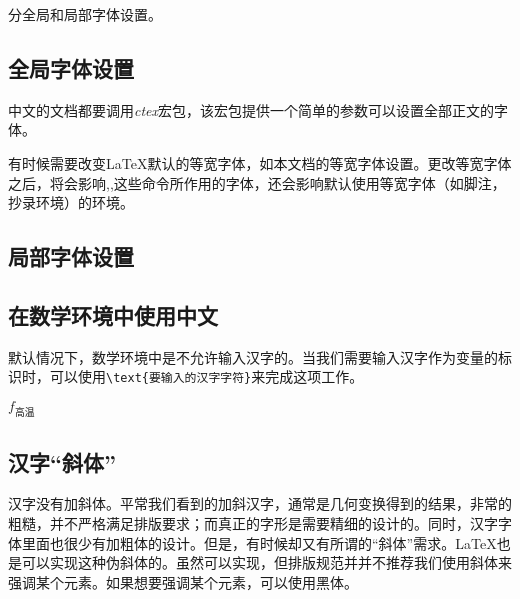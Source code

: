 分全局和局部字体设置。
\subsection{全局字体设置}
中文的文档都要调用\emph{ctex}宏包，该宏包提供一个简单的参数可以设置全部正文的字体。

\begin{latex}
\setmainfont{Times New Roman}    %
\end{latex}

有时候需要改变\LaTeX 默认的等宽字体，如本文档的等宽字体设置。更改等宽字体之后，将会影响,,这些命令所作用的字体，还会影响默认使用等宽字体（如脚注，抄录环境）的环境。

\begin{latex}
\setmonofont{Source Code Pro}    %
\end{latex}

\subsection{局部字体设置}

\begin{latex}
\newfontfamily{}    %
\end{latex}

\subsection{在数学环境中使用中文}
默认情况下，数学环境中是不允许输入汉字的。当我们需要输入汉字作为变量的标识时，可以使用\verb|\text{要输入的汉字字符}|来完成这项工作。

\begin{codeshow}
$f_{\text{高温}}$
\end{codeshow}

\subsection{汉字“斜体”}
汉字没有加斜体。平常我们看到的加斜汉字，通常是几何变换得到的结果，非常的粗糙，并不严格满足排版要求；而真正的字形是需要精细的设计的。同时，汉字字体里面也很少有加粗体的设计。但是，有时候却又有所谓的“斜体”需求。\LaTeX 也是可以实现这种伪斜体的。虽然可以实现，但排版规范并并不推荐我们使用斜体来强调某个元素。如果想要强调某个元素，可以使用{\heiti 黑体}。

